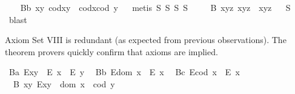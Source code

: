 \begin{isabellebody}
\endisatagproof
{\isafoldproof}%
%
\isadelimproof
%
\endisadelimproof
\isanewline
\ \ \isamarkupfalse%
\ B{}b{\isacharcolon}\ {\isachardoublequoteopen}\isactrlbold {\isasymforall}x{\isachardot}\isactrlbold {\isasymforall}y{\isachardot}\ cod{\isacharparenleft}x{\isasymcdot}y{\isacharparenright}\ {\isasymcong}\ cod{\isacharparenleft}x{\isasymcdot}{\isacharparenleft}cod\ y{\isacharparenright}{\isacharparenright}{\isachardoublequoteclose}%
\isadelimproof
\ %
\endisadelimproof
%
\isatagproof
{}\isamarkupfalse%
\ {\isacharparenleft}metis\ S{}\ S{}\ S{}\ S{}{\isacharparenright}%
\endisatagproof
{\isafoldproof}%
%
\isadelimproof
%
\endisadelimproof
\isanewline
\ \ \isamarkupfalse%
\ \ B{}{\isacharcolon}\ {\isachardoublequoteopen}\isactrlbold {\isasymforall}x{\isachardot}\isactrlbold {\isasymforall}y{\isachardot}\isactrlbold {\isasymforall}z{\isachardot}\ x{\isasymcdot}{\isacharparenleft}y{\isasymcdot}z{\isacharparenright}\ {\isasymcong}\ {\isacharparenleft}x{\isasymcdot}y{\isacharparenright}{\isasymcdot}z{\isachardoublequoteclose}%
\isadelimproof
\ %
\endisadelimproof
%
\isatagproof
{}\isamarkupfalse%
\ S{}\ \isamarkupfalse%
\ blast%
\endisatagproof
{\isafoldproof}%
%
\isadelimproof
%
\endisadelimproof
%
\begin{isamarkuptext}%
Axiom Set VIII is redundant (as expected from previous observations).
The theorem provers quickly confirm that axioms  are implied.%
\end{isamarkuptext}\isamarkuptrue%
\ B{}a{\isacharcolon}\ {\isachardoublequoteopen}E{\isacharparenleft}x{\isasymcdot}y{\isacharparenright}\ \isactrlbold {\isasymrightarrow}\ {\isacharparenleft}E\ x\ \isactrlbold {\isasymand}\ E\ y{\isacharparenright}{\isachardoublequoteclose}\ \isanewline
\ B{}b{\isacharcolon}\ {\isachardoublequoteopen}E{\isacharparenleft}dom\ x{\isacharparenright}\ \isactrlbold {\isasymrightarrow}\ E\ x{\isachardoublequoteclose}\ \isanewline
\ B{}c{\isacharcolon}\ {\isachardoublequoteopen}E{\isacharparenleft}cod\ x{\isacharparenright}\ \isactrlbold {\isasymrightarrow}\ E\ x{\isachardoublequoteclose}\ \isanewline
\ \ B{}{\isacharcolon}\ {\isachardoublequoteopen}\isactrlbold {\isasymforall}x{\isachardot}\isactrlbold {\isasymforall}y{\isachardot}\ E{\isacharparenleft}x{\isasymcdot}y{\isacharparenright}\ \isactrlbold {\isasymleftrightarrow}\ dom\ x\ {\isasymcong}\ cod\ y{\isachardoublequoteclose}\ \isanewline

\end{isabellebody}
